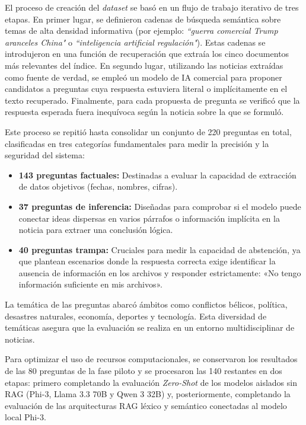 El proceso de creación del \textit{dataset} se basó en un flujo de trabajo iterativo de tres etapas. En primer lugar, se definieron cadenas de búsqueda semántica sobre temas de alta densidad informativa (por ejemplo: \textit{``guerra comercial Trump aranceles China"} o \textit{``inteligencia artificial regulación"}). Estas cadenas se introdujeron en una función de recuperación que extraía los cinco documentos más relevantes del índice. En segundo lugar, utilizando las noticias extraídas como fuente de verdad, se empleó un modelo de IA comercial \cite{google2026gemini} para proponer candidatos a preguntas cuya respuesta estuviera literal o implícitamente en el texto recuperado. Finalmente, para cada propuesta de pregunta se verificó que la respuesta esperada fuera inequívoca según la noticia sobre la que se formuló.

Este proceso se repitió hasta consolidar un conjunto de 220 preguntas en total, clasificadas en tres categorías fundamentales para medir la precisión y la seguridad del sistema:
\begin{itemize}
    \item \textbf{143 preguntas factuales:} Destinadas a evaluar la capacidad de extracción de datos objetivos (fechas, nombres, cifras).
    \item \textbf{37 preguntas de inferencia:} Diseñadas para comprobar si el modelo puede conectar ideas dispersas en varios párrafos o información implícita en la noticia para extraer una conclusión lógica.
    \item \textbf{40 preguntas trampa:} Cruciales para medir la capacidad de abstención, ya que plantean escenarios donde la respuesta correcta exige identificar la ausencia de información en los archivos y responder estrictamente: «No tengo información suficiente en mis archivos».
\end{itemize}

La temática de las preguntas abarcó ámbitos como conflictos bélicos, política, desastres naturales, economía, deportes y tecnología. Esta diversidad de temáticas asegura que la evaluación se realiza en un entorno multidisciplinar de noticias.

Para optimizar el uso de recursos computacionales, se conservaron los resultados de las 80 preguntas de la fase piloto y se procesaron las 140 restantes en dos etapas: primero completando la evaluación \textit{Zero-Shot} de los modelos aislados sin RAG (Phi-3, Llama 3.3 70B y Qwen 3 32B) y, posteriormente, completando la evaluación de las arquitecturas RAG léxico y semántico conectadas al modelo local Phi-3.


